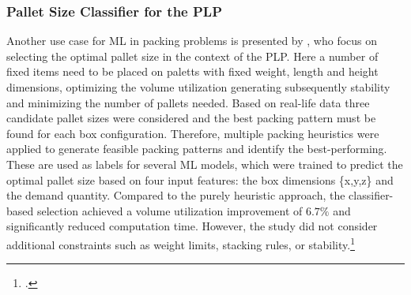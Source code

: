 \subsubsection{Pallet Size Classifier for the \gls{PLP}}
Another use case for \gls{ML} in packing problems is presented by \citeauthor*{aylak_application_2021},
who focus on selecting the optimal pallet size in the context of the \gls{PLP}. Here a number of fixed items
need to be placed on paletts with fixed weight, length and height dimensions, optimizing the volume utilization
generating subsequently stability and minimizing the number of pallets needed. Based on real-life data
three candidate pallet sizes were considered and the best packing pattern must be found for each box
configuration. Therefore, multiple packing heuristics were applied to
generate feasible packing patterns and identify the best-performing. These are used as labels for several
\gls{ML} models, which were trained to predict the optimal pallet size based on four input features: the box
dimensions \{x,y,z\} and the demand quantity. Compared to the purely heuristic approach, the classifier-based
selection achieved a volume utilization improvement of $6.7\%$ and significantly reduced computation time.
However, the study did not consider additional constraints such as weight limits, stacking rules, or stability.\footcite[cf.][pp. 12--14]{aylak_application_2021}

\parbreak

